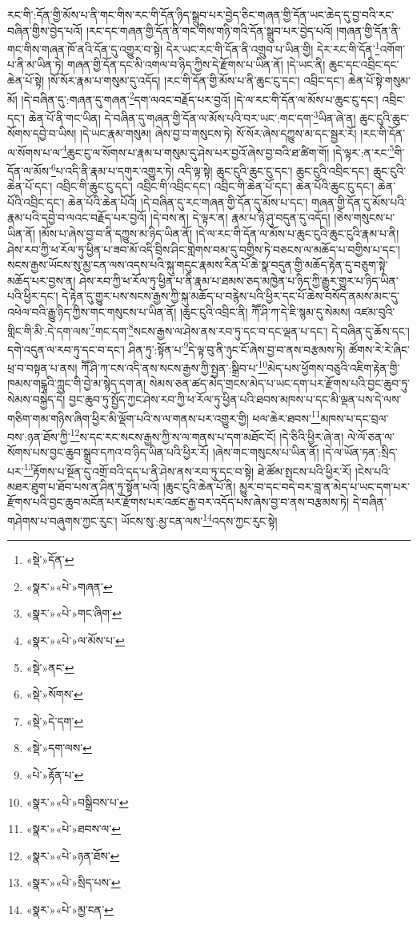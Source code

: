 རང་གི་:དོན་གྱི་མོས་པ་ནི་གང་གིས་རང་གི་དོན་ཉིད་སྒྲུབ་པར་བྱེད་ཅིང་གཞན་གྱི་དོན་ཡང་ཆེད་དུ་བྱ་བའི་རང་བཞིན་གྱིས་བྱེད་པའོ། །རང་དང་གཞན་གྱི་དོན་ནི་གང་གིས་གཉི་གའི་དོན་སྒྲུབ་པར་བྱེད་པའོ། །གཞན་གྱི་དོན་ནི་གང་གིས་གཞན་ཁོ་ནའི་དོན་དུ་འགྱུར་བ་སྟེ། དེར་ཡང་རང་གི་དོན་ནི་འགྲུབ་པ་ཡིན་གྱི། དེར་རང་གི་དོན་\footnote{«སྡེ་»དོན་}འགོག་པ་ནི་མ་ཡིན་ཏེ། གཞན་གྱི་དོན་དང་མི་འགལ་བ་ཉིད་ཀྱིས་དེ་རྫོགས་པ་ཡིན་ནོ། །དེ་ཡང་ནི། ཆུང་དང་འབྲིང་དང་ཆེན་པོ་སྟེ། །སོ་སོར་རྣམ་པ་གསུམ་དུ་འདོད། །རང་གི་དོན་གྱི་མོས་པ་ནི་ཆུང་ངུ་དང་། འབྲིང་དང་། ཆེན་པོ་སྟེ་གསུམ་མོ། །དེ་བཞིན་དུ་:གཞན་དུ་གཞན་\footnote{«སྣར་»«པེ་»གཞན་}དག་ལའང་བརྗོད་པར་བྱའོ། །དེ་ལ་རང་གི་དོན་ལ་མོས་པ་ཆུང་ངུ་དང་། འབྲིང་དང་། ཆེན་པོ་ནི་གང་ཡིན། དེ་བཞིན་དུ་གཞན་གྱི་དོན་ལ་མོས་པའི་བར་ཡང་:གང་དག་\footnote{«སྣར་»«པེ་»གང་ཞིག་}ཡིན་ཞེ་ན། ཆུང་ངུའི་ཆུང་སོགས་དབྱེ་བ་ཡིས། །དེ་ཡང་རྣམ་གསུམ། ཞེས་བྱ་བ་གསུངས་ཏེ། སོ་སོར་ཞེས་དཀྱུས་མ་དང་སྦྱར་རོ། །རང་གི་དོན་ལ་སོགས་པ་ལ་\footnote{«སྣར་»«པེ་»ལ་མོས་པ་}ཆུང་ངུ་ལ་སོགས་པ་རྣམ་པ་གསུམ་དུ་ཤེས་པར་བྱའོ་ཞེས་བྱ་བའི་ཐ་ཚིག་གོ། །དེ་ལྟར་:ན་རང་\footnote{«སྡེ་»ནང་}གི་དོན་ལ་མོས་\footnote{«སྡེ་»སོགས་}པ་འདི་ནི་རྣམ་པ་དགུར་འགྱུར་ཏེ། འདི་ལྟ་སྟེ། ཆུང་ངུའི་ཆུང་ངུ་དང་། ཆུང་ངུའི་འབྲིང་དང་། ཆུང་ངུའི་ཆེན་པོ་དང་། འབྲིང་གི་ཆུང་ངུ་དང་། འབྲིང་གི་འབྲིང་དང་། འབྲིང་གི་ཆེན་པོ་དང་། ཆེན་པོའི་ཆུང་ངུ་དང་། ཆེན་པོའི་འབྲིང་དང་། ཆེན་པོའི་ཆེན་པོའོ། །དེ་བཞིན་དུ་རང་གཞན་གྱི་དོན་དུ་མོས་པ་དང་། གཞན་གྱི་དོན་དུ་མོས་པའི་རྣམ་པའི་དབྱེ་བ་ལའང་བརྗོད་པར་བྱའོ། །དེ་བས་ན། དེ་ལྟར་ན། རྣམ་པ་ཉི་ཤུ་བདུན་དུ་འདོད། །ཅེས་གསུངས་པ་ཡིན་ནོ། །མོས་པ་ཞེས་བྱ་བ་ནི་དཀྱུས་མ་ཉིད་ཡིན་ནོ། །དེ་ལ་རང་གི་དོན་ལ་མོས་པ་ཆུང་ངུའི་ཆུང་ངུའི་རྣམ་པ་ནི། ཤེས་རབ་ཀྱི་ཕ་རོལ་ཏུ་ཕྱིན་པ་ཟབ་མོ་འདི་བྲིས་ཤིང་གླེགས་བམ་དུ་བགྱིས་ཏེ་བཅངས་ལ་མཆོད་པ་བགྱིས་པ་དང་། སངས་རྒྱས་ཡོངས་སུ་མྱ་ངན་ལས་འདས་པའི་སྐུ་གདུང་རྣམས་རིན་པོ་ཆེ་སྣ་བདུན་གྱི་མཆོད་རྟེན་དུ་བཅུག་སྟེ་མཆོད་པར་བྱས་ན། ཤེས་རབ་ཀྱི་ཕ་རོལ་ཏུ་ཕྱིན་པ་ནི་རྣམ་པ་ཐམས་ཅད་མཁྱེན་པ་ཉིད་ཀྱི་རྒྱུར་གྱུར་པ་ཉིད་ཡིན་པའི་ཕྱིར་དང་། དེ་རྟེན་དུ་གྱུར་པས་སངས་རྒྱས་ཀྱི་སྐུ་མཆོད་པ་བརྙེས་པའི་ཕྱིར་དང་པོ་ཆེས་བསོད་ནམས་མང་དུ་འཕེལ་བའི་རྒྱུ་ཉིད་ཀྱིས་གང་གསུངས་པ་ཡིན་ནོ། །ཆུང་ངུའི་འབྲིང་ནི། ཀཽ་ཤི་ཀ་དེ་ཇི་སྙམ་དུ་སེམས། འཛམ་བུའི་གླིང་གི་མི་:དེ་དག་ལས་\footnote{«སྡེ་»དེ་དག་}གང་དག་\footnote{«སྡེ་»དག་ལས་}སངས་རྒྱས་ལ་ཤེས་ནས་རབ་ཏུ་དང་བ་དང་ལྡན་པ་དང་། དེ་བཞིན་དུ་ཆོས་དང་། དགེ་འདུན་ལ་རབ་ཏུ་དང་བ་དང་། ཤིན་ཏུ་:སྟོན་པ་\footnote{«པེ་»རྟོན་པ་}དེ་ལྟ་བུ་ནི་ཉུང་ངོ་ཞེས་བྱ་བ་ནས་བརྩམས་ཏེ། ཚོགས་རེ་རེ་ཞིང་ཕྲ་བ་བསྟན་པ་ནས། ཀཽ་ཤི་ཀ་ངས་འདི་ནས་སངས་རྒྱས་ཀྱི་སྤྱན་:སྒྲིབ་པ་\footnote{«སྣར་»«པེ་»བསྒྲིབས་པ་}མེད་པས་ཕྱོགས་བཅུའི་འཇིག་རྟེན་གྱི་ཁམས་གངྒཱའི་ཀླུང་གི་བྱེ་མ་སྙེད་དག་ན། སེམས་ཅན་ཚད་མེད་གྲངས་མེད་པ་ཡང་དག་པར་རྫོགས་པའི་བྱང་ཆུབ་ཏུ་སེམས་བསྐྱེད་དེ། བྱང་ཆུབ་ཏུ་སྤྱོད་ཀྱང་ཤེས་རབ་ཀྱི་ཕ་རོལ་ཏུ་ཕྱིན་པའི་ཐབས་མཁས་པ་དང་མི་ལྡན་པས་དེ་ལས་གཅིག་གམ་གཉིས་ཞིག་ཕྱིར་མི་ལྡོག་པའི་ས་ལ་གནས་པར་འགྱུར་གྱི། ཕལ་ཆེར་ཐབས་\footnote{«སྣར་»«པེ་»ཐབས་ལ་}མཁས་པ་དང་བྲལ་བས་:ཉན་ཐོས་ཀྱི་\footnote{«སྣར་»«པེ་»ཉན་ཐོས་}ས་དང་རང་སངས་རྒྱས་ཀྱི་ས་ལ་གནས་པ་དག་མཐོང་ངོ། །དེ་ཅིའི་ཕྱིར་ཞེ་ན། ལེ་ལོ་ཅན་ལ་སོགས་པས་བྱང་ཆུབ་སྒྲུབ་དཀའ་བ་ཉིད་ཡིན་པའི་ཕྱིར་རོ། །ཞེས་གང་གསུངས་པ་ཡིན་ནོ། །དེ་ལ་ཡོན་ཏན་:སྲིད་པར་\footnote{«སྣར་»«པེ་»སྲིད་པས་}རྟོགས་པ་སྔོན་དུ་འགྲོ་བའི་དད་པ་ནི་ཤེས་ནས་རབ་ཏུ་དང་བ་སྟེ། ཐེ་ཚོམ་སྤངས་པའི་ཕྱིར་རོ། །ངེས་པའི་མཐར་ཐུག་པ་ཐོབ་པས་ན་ཤིན་ཏུ་སྟོན་པའོ། །ཆུང་ངུའི་ཆེན་པོ་ནི། མྱུར་བ་དང་བདེ་བར་བླ་ན་མེད་པ་ཡང་དག་པར་རྫོགས་པའི་བྱང་ཆུབ་མངོན་པར་རྫོགས་པར་འཚང་རྒྱ་བར་འདོད་པས་ཞེས་བྱ་བ་ནས་བརྩམས་ཏེ། དེ་བཞིན་གཤེགས་པ་བཞུགས་ཀྱང་རུང་། ཡོངས་སུ་:མྱ་ངན་ལས་\footnote{«སྣར་»«པེ་»མྱ་ངན་}འདས་ཀྱང་རུང་སྟེ། 